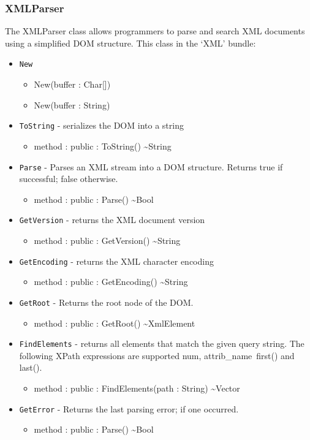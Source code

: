 \documentclass[11pt]{article}
\begin{document}
\subsubsection{XMLParser}
The XMLParser class allows programmers to parse and search XML
documents using a simplified DOM structure.  This class in the `XML'
bundle:
\begin{itemize}
\item \texttt{New}
  \begin{itemize}
  \item New(buffer : Char[])
  \item New(buffer : String)
  \end{itemize}
\item \texttt{ToString} - serializes the DOM into a string
  \begin{itemize}
  \item method : public : ToString() \textasciitilde String
  \end{itemize}
\item \texttt{Parse} - Parses an XML stream into a DOM structure.
  Returns true if successful; false otherwise.
  \begin{itemize}
  \item method : public : Parse() \textasciitilde Bool
  \end{itemize}
\item \texttt{GetVersion} - returns the XML document version
  \begin{itemize}
  \item method : public : GetVersion() \textasciitilde String
  \end{itemize}
\item \texttt{GetEncoding} - returns the XML character encoding
  \begin{itemize}
  \item method : public : GetEncoding() \textasciitilde String
  \end{itemize}
\item \texttt{GetRoot} - Returns the root node of the DOM.
  \begin{itemize}
  \item method : public : GetRoot() \textasciitilde XmlElement
  \end{itemize}
\item \texttt{FindElements} - returns all elements that match the
  given query string.  The following XPath expressions are supported
  num, attrib\_name\, first() and last().
  \begin{itemize}
  \item method : public : FindElements(path : String) \textasciitilde Vector
  \end{itemize}
\item \texttt{GetError} - Returns the last parsing error; if one
  occurred.
  \begin{itemize}
  \item method : public : Parse() \textasciitilde Bool
  \end{itemize}
\end{itemize}
\end{document}

